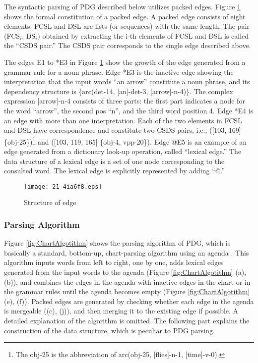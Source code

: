 \documentclass[english]{jnlp_1.4_rep}
\theoremstyle{break}
\theoremstyle{plain}
\theoremstyle{plain}
\begin{document}
The syntactic parsing of PDG described below utilizes packed
edges. Figure \ref{fig:ArcStructure} shows the formal constitution of a
packed edge. A packed edge consists of eight elements. FCSL and DSL
are lists (or sequences) with the same length. The pair
(FCS$_i$, DS$_i$) obtained by extracting the i-th elements of FCSL and
DSL is called the ``CSDS pair.'' The CSDS pair corresponds to the single edge
described above.

The edges E1 to *E3 in Figure \ref{fig:ArcStructure} show the growth of
the edge generated from a grammar rule for a noun phrase. Edge *E3 is
the inactive edge showing the interpretation that the input words ``an
arrow'' constitute a noun phrase, and its dependency structure is
\{arc(det-14, [an]-det-3, [arrow]-n-4)\}.  The complex expression
[arrow]-n-4 consists of three parts: the first part indicates a node
for the word ``arrow'', the second pos ``n'', and the third word
position 4. Edge *E4 is an edge with more than one
interpretation. Each of the two elements in FCSL and DSL have
correspondence and constitute two CSDS pairs, i.e., ([103, 169]
\{obj-25\})\footnote{The obj-25 is the abbreviation of arc(obj-25,
  [flies]-n-1, [time]-v-0).} and ([103, 119, 165] \{obj-4,
vpp-20\}). Edge @E5 is an example of an edge generated from
a dictionary look-up operation, called ``lexical edge.'' The data
structure of a lexical edge is a set of one node corresponding to the
consulted word. The lexical edge is explicitly represented by adding
``@.''

\begin{figure}[t]
 \begin{center}
\texttt{[image: 21-4ia6f8.eps]}
 \end{center}
\caption{Structure of edge}
\label{fig:ArcStructure}
\end{figure}


\subsubsection{Parsing Algorithm}

Figure \ref{fig:ChartAlgotithm} shows the parsing algorithm of PDG, which
is basically a standard, bottom-up, chart-parsing algorithm using an
agenda \cite{Winograd83}. This algorithm inputs words from left to
right, one by one, adds lexical edges generated from the input words
to the agenda (Figure \ref{fig:ChartAlgotithm} (a), (b)), and combines
the edges in the agenda with inactive edges in the chart or in the
grammar rules until the agenda becomes empty
(Figure \ref{fig:ChartAlgotithm} (e), (f)). Packed edges are generated by
checking whether each edge in the agenda is mergeable ((c), (j)), and
then merging it to the existing edge if possible. A detailed
explanation of the algorithm is omitted. The following part explains
the construction of the data structure, which is peculiar to PDG
parsing.
\end{document}
